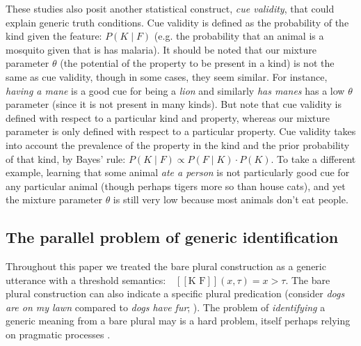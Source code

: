 \documentclass[12pt,letterpaper]{article}
\newcommand{\denote}[1]{\mbox{ $[\![ #1 ]\!]$}}
\newcommand{\mht}[1]{\textcolor{Blue}{[mht: #1]}}
\begin{document}
These studies also posit another statistical construct, \emph{cue validity}, that could explain generic truth conditions. Cue validity is defined as the probability of the kind given the feature: $P(K \mid F)$ (e.g. the probability that an animal is a mosquito given that is has malaria).
It should be noted that our mixture parameter $\theta$ (the potential of the property to be present in a kind) is not the same as cue validity, though in some cases, they seem similar.
For instance, \emph{having a mane} is a good cue for being a \emph{lion} and similarly \emph{has manes} has a low $\theta$ parameter (since it is not present in many kinds). 
But note that cue validity is defined with respect to a particular kind and property, whereas our mixture parameter is only defined with respect to a particular property.
Cue validity takes into account the prevalence of the property in the kind and the prior probability of that kind, by Bayes' rule: $P(K \mid F) \propto P(F \mid K) \cdot P(K)$. 
To take a different example, learning that some animal \emph{ate a person} is not particularly good cue for any particular animal  (though perhaps tigers more so than house cats), and yet the mixture parameter $\theta$ is still very low because most animals don't eat people.



\subsection*{The parallel problem of generic identification}

Throughout this paper we treated the bare plural construction as a generic utterance with a threshold semantics: $\denote{\text{K F}}(x, \tau)=x>\tau$.
The bare plural construction can also indicate a specific plural predication (consider \emph{dogs are on my lawn} compared to \emph{dogs have fur};  ).
The problem of \emph{identifying} a generic meaning from a bare plural may is a hard problem, itself perhaps relying on pragmatic processes \cite{Cimpian2008, Declerck1991}. 
\end{document}
